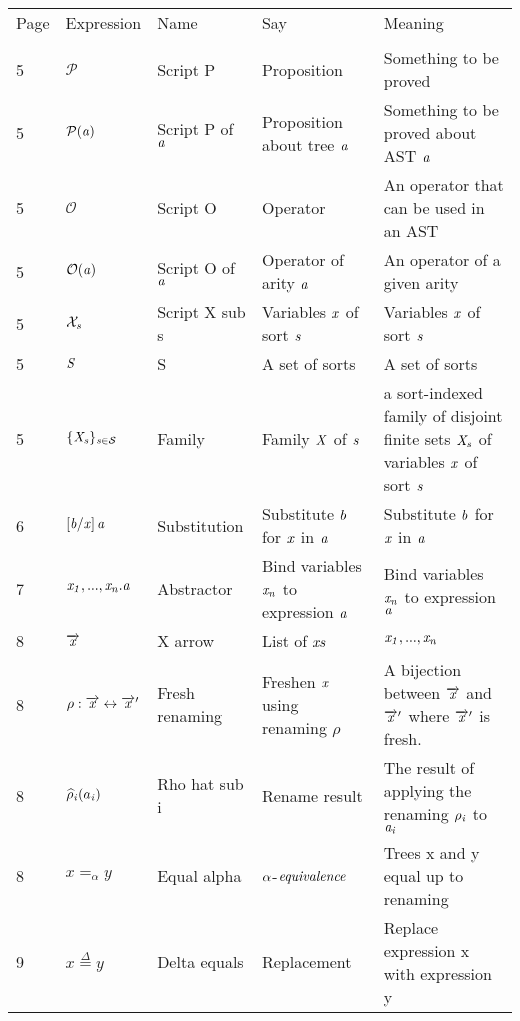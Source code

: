 \documentclass[12pt]{article}
\begin{document}
\begin{tabular}[b] {p{} p{} p{} p{} p{}}
Page & Expression & Name & Say & Meaning \\ \\
5& $\mathcal{P}$ & Script P & Proposition & Something to be proved \\
5& $\mathcal{P}(\it{a})$ & Script P of $\it{a}$ & Proposition about tree $\it{a}$ & Something to be proved about AST $\it{a}$ \\
5& $\mathcal{O}$ & Script O & Operator & An operator that can be used in an AST \\
5& $\mathcal{O}(\it{a})$ & Script O of $\it{a}$ & Operator of arity $\it{a}$ & An operator of a given arity \\
5& $\mathcal{X}_{\it{s}}$ & Script X sub s & Variables $\it{x}$ of sort $\it{s}$ & Variables $\it{x}$ of sort $\it{s}$ \\
5& $\it{S} $ & S & A set of sorts & A set of sorts \\
5& $ \{ \it{X}_{s} \} _{\it{s} \in \mathcal{S}}$  & Family & Family $ \it{X} $ of $\it{s}$ & a sort-indexed family of disjoint finite sets $ \it{X}_s $ of variables $\it{x}$ of sort $ \it{s} $\\
6& $\left[ \it{b} / \it{x}\right] \it{a}$ & Substitution & Substitute $\it{b}$ for $\it{x}$ in $\it{a}$ & Substitute  $\it{b}$ for $\it{x}$ in $\it{a}$ \\
7& $ \it{x}_1, ... ,\it{x}_{\it{n}}.\it{a} $ & Abstractor & Bind variables $\it{x_n}$ to expression $\it{a}$ & Bind variables $\it{x_n}$ to expression $\it{a}$ \\
8& $ \overrightarrow{\it{x}} $ & X arrow & List of $\it{x}s$ & $ \it{x}_1, ... ,\it{x}_{\it{n}} $ \\
8& $ \rho : \overrightarrow{\it{x}} \leftrightarrow \overrightarrow{\it{x}}'$ & Fresh renaming & Freshen $ \it{x} $ using renaming $ \rho $ & A bijection between $ \overrightarrow{\it{x}} $ and $ \overrightarrow{\it{x}}' $ where $ \overrightarrow{\it{x}}'$ is fresh. \\
8& $\widehat{\rho}_{\it{i}} (a_{\it{i}})$ & Rho hat sub i & Rename result & The result of applying the renaming $ \rho_ {\it{i}} $ to $ \it{a}_{\it{i}} $ \\
8& $x =_\alpha y$ & Equal alpha & $ \it{\alpha}$-$\it{equivalence} $ & Trees x and y equal up to renaming \\
9& $x \overset{\Delta}{=} y$ & Delta equals & Replacement & Replace expression x with expression y \\

\end{tabular}
\end{document}
